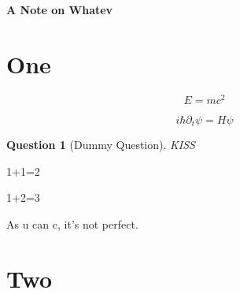 \documentclass[a4paper,UTF8]{ctexart}
\newtheorem{question}{Question}
\begin{document}
\begin{center}
    \textbf{\Large A Note on Whatev}
    \par {}
\end{center}

{}
\setcounter{page}{1}
\tableofcontents

\setcounter{page}{1}

\section{One}

\begin{definition}
    \begin{equation}
        E = mc^2
    \end{equation}
\end{definition}

\begin{remark}[My remark]
    \begin{equation}
        i \hbar \partial_{t} \psi = H \psi
    \end{equation}
\end{remark}

\begin{question}[Dummy Question]
    KISS
\end{question}

\begin{review}
    1+1=2
\end{review}

\begin{lemma}[Nope]
    1+2=3
\end{lemma}

As u can c, it's not perfect.

\section{Two}

%
\end{document}
